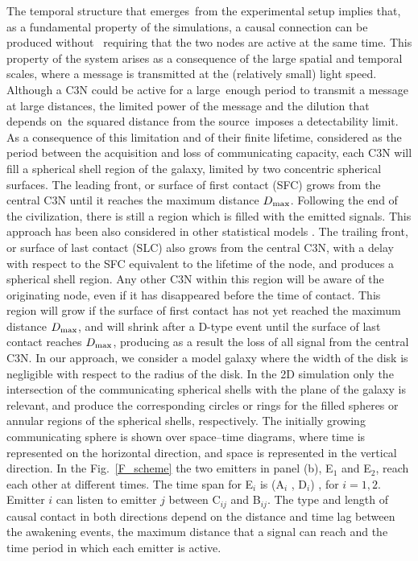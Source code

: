 \documentclass[crop]{CSLB}
\newcommand{\ceti}{C3N}
\begin{document}
The temporal structure that emerges from the experimental setup implies that, as a fundamental property of the simulations, a causal connection can be produced without 
requiring that the two nodes are active at the same time.
%
This property of the system arises as a consequence of the large spatial and temporal scales, where a message is transmitted at the (relatively small) light speed.
%
Although a \ceti{} could be active for a large enough period to transmit a message at large distances, the limited power of the message and the dilution that depends on the squared distance from the source imposes a detectability limit.
%
As a consequence of this limitation and of their finite lifetime, considered as the period between the acquisition and loss of communicating capacity, each \ceti{} will fill a spherical shell region of the galaxy, limited by two concentric spherical surfaces.
%
The leading front, or surface of first contact (SFC) grows from the
central \ceti{} until it reaches the maximum distance $D_{\rm max}$.
%
Following the end of the civilization, there is still a region which is filled with the emitted signals.
%
This approach has been also considered in other statistical models \citep[e.g., ][]{smith_broadcasting_2009, grimaldi_signal_2017, Grimaldi2018}.
%
The trailing front, or surface of last contact (SLC) also grows from the central \ceti{}, with a delay with respect to the SFC equivalent to the lifetime of the node, and produces a spherical shell region.
%
Any other \ceti{} within this region will be aware of the originating node, even if it has disappeared before the time of contact.
%
This region will grow if the surface of first contact has not yet
reached the maximum distance $D_{\rm max}$, and will shrink after a
D-type event until the surface of last contact reaches $D_{\rm max}$, producing as a result the loss of all signal from the central \ceti{}.
%
In our approach, we consider a model galaxy where the width of the disk is negligible with respect to the radius of the disk.
%
In the 2D simulation only the intersection of the communicating spherical shells with the plane of the galaxy is relevant, and produce the corresponding circles or rings for the filled spheres or annular regions of the spherical shells, respectively.
%
The initially growing communicating sphere is shown over space--time diagrams, where time is represented on the horizontal direction, and space is represented in the vertical direction.
%
In the Fig.~\ref{F_scheme} the two emitters in panel (b), E$_1$ and E$_2$, reach each other at different times.
%
The time span for E$_i$ is (A$_i$ , D$_i$) , for $i = {1, 2}$.
%
Emitter $i$ can listen to emitter $j$ between C$_{ij}$ and B$_{ij}$.
%
The type and length of causal contact in both directions depend on the distance and time lag between the awakening events, the maximum distance that a signal can reach and the time period in which each emitter is active.
\end{document}
